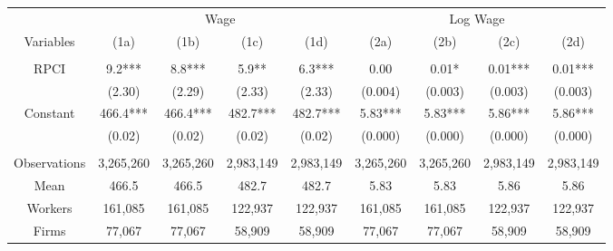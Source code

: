 \begin{tabular}{c|cccc|cccc}
\toprule
\toprule
      & \multicolumn{4}{c|}{Wage}     & \multicolumn{4}{c}{Log Wage} \\
Variables & (1a)  & (1b)  & (1c)  & (1d)  & (2a)  & (2b)  & (2c)  & (2d) \\
\midrule
      &       &       &       &       &       &       &       &  \\
RPCI  & 9.2*** & 8.8*** & 5.9** & 6.3*** & 0.00  & 0.01* & 0.01*** & 0.01*** \\
      & (2.30) & (2.29) & (2.33) & (2.33) & (0.004) & (0.003) & (0.003) & (0.003) \\
Constant & 466.4*** & 466.4*** & 482.7*** & 482.7*** & 5.83*** & 5.83*** & 5.86*** & 5.86*** \\
      & (0.02) & (0.02) & (0.02) & (0.02) & (0.000) & (0.000) & (0.000) & (0.000) \\
      &       &       &       &       &       &       &       &  \\
\midrule
Observations & 3,265,260 & 3,265,260 & 2,983,149 & 2,983,149 & 3,265,260 & 3,265,260 & 2,983,149 & 2,983,149 \\
Mean  & 466.5 & 466.5 & 482.7 & 482.7 & 5.83  & 5.83  & 5.86  & 5.86 \\
Workers & 161,085 & 161,085 & 122,937 & 122,937 & 161,085 & 161,085 & 122,937 & 122,937 \\
Firms & 77,067 & 77,067 & 58,909 & 58,909 & 77,067 & 77,067 & 58,909 & 58,909 \\
\bottomrule
\bottomrule
\end{tabular}%
